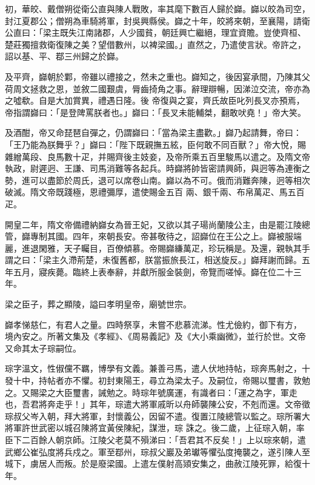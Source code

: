 \begin{pinyinscope}
 初，華皎、戴僧朔從衛公直與陳人戰敗，率其麾下數百人歸於巋。巋以皎為司空，封江夏郡公；僧朔為車騎將軍，封吳興縣侯。巋之十年，皎將來朝，至襄陽，請衛公直曰：「梁主既失江南諸郡，人少國貧，朝廷興亡繼絕，理宜資贍。豈使齊桓、楚莊獨擅救衛復陳之美？望借數州，以裨梁國。」直然之，乃遣使言狀。帝許之，詔以基、平、鄀三州歸之於巋。



 及平齊，巋朝於鄴，帝雖以禮接之，然未之重也。巋知之，後因宴承間，乃陳其父荷周文拯救之恩，並敘二國艱虞，脣齒掎角之事。辭理辯暢，因涕泣交流，帝亦為之噓欷。自是大加賞異，禮遇日隆。後
 帝復與之宴，齊氏故臣叱列長叉亦預焉，帝指謂巋曰：「是登陴罵朕者也。」巋曰：「長叉未能輔桀，翻敢吠堯！」帝大笑。



 及酒酣，帝又命琵琶自彈之，仍謂巋曰：「當為梁主盡歡。」巋乃起請舞，帝曰：「王乃能為朕舞乎？」巋曰：「陛下既親撫五絃，臣何敢不同百獸？」帝大悅，賜雜繒萬段、良馬數十疋，并賜齊後主妓妾，及帝所乘五百里駿馬以遣之。及隋文帝執政，尉遲迥、王謙、司馬消難等各起兵。時巋將帥皆密請興師，與迥等為連衡之勢，進可以盡節於周氏，退可以席卷山南。巋以為不可。俄而消難奔陳，迥等相次破滅。隋文帝既踐極，恩禮彌厚，遣使賜金五百
 兩、銀千兩、布帛萬疋、馬五百疋。



 開皇二年，隋文帝備禮納巋女為晉王妃，又欲以其子瑒尚蘭陵公主，由是罷江陵總管，巋專制其國。四年，來朝長安。帝甚敬待之，詔巋位在王公之上。巋被服端麗，進退閑雅，天子矚目，百僚傾慕。帝賜巋縑萬疋，珍玩稱是。及還，親執其手謂之曰：「梁主久滯荊楚，未復舊都，朕當振旅長江，相送旋反。」巋拜謝而歸。五年五月，寢疾薨。臨終上表奉辭，并獻所服金裝劍，帝覽而嗟悼。巋在位二十三年。



 梁之臣子，葬之顯陵，謚曰孝明皇帝，廟號世宗。



 巋孝悌慈仁，有君人之量。四時祭享，未嘗不悲慕流涕。性尤儉約，御下有方，
 境內安之。所著文集及《孝經》、《周易義記》及《大小乘幽微》，並行於世。文帝又命其太子琮嗣位。



 琮字溫文，性俶儻不羈，博學有文義。兼善弓馬，遣人伏地持帖，琮奔馬射之，十發十中，持帖者亦不懼。初封東陽王，尋立為梁太子。及嗣位，帝賜以璽書，敦勉之。又賜梁之大臣璽書，誡勉之。時琮年號廣運，有識者曰：「運之為字，軍走也，吾君將奔走乎！」其年，琮遣大將軍戚昕以舟師襲陳公安，不剋而還。文帝徵琮叔父岑入朝，拜大將軍，封懷義公，因留不遣。復置江陵總管以監之。琮所署大將軍許世武密以城召陳將宜黃侯陳紀，謀泄，琮
 誅之。後二歲，上征琮入朝，率臣下二百餘人朝京師。江陵父老莫不殞涕曰：「吾君其不反矣！」上以琮來朝，遣武鄉公崔弘度將兵戍之。軍至鄀州，琮叔父巖及弟瓛等懼弘度掩襲之，遂引陳人至城下，虜居人而叛。於是廢梁國。上遣左僕射高熲安集之，曲赦江陵死罪，給復十年。




\end{pinyinscope}
